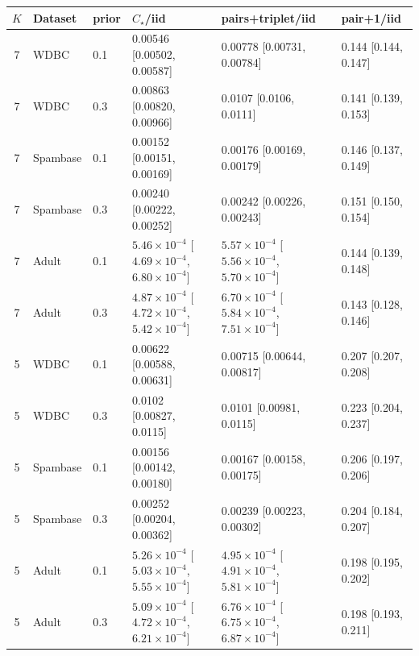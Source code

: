 \begin{tabular}{clllll}
\toprule
$K$ & Dataset & prior & $C_\star$/iid & pairs+triplet/iid & pair+1/iid \\
\midrule
7 & WDBC & 0.1 & 0.00546 [0.00502, 0.00587] & 0.00778 [0.00731, 0.00784] & 0.144 [0.144, 0.147] \\
7 & WDBC & 0.3 & 0.00863 [0.00820, 0.00966] & 0.0107 [0.0106, 0.0111] & 0.141 [0.139, 0.153] \\
7 & Spambase & 0.1 & 0.00152 [0.00151, 0.00169] & 0.00176 [0.00169, 0.00179] & 0.146 [0.137, 0.149] \\
7 & Spambase & 0.3 & 0.00240 [0.00222, 0.00252] & 0.00242 [0.00226, 0.00243] & 0.151 [0.150, 0.154] \\
7 & Adult & 0.1 & $5.46\times 10^{-4}$ [$4.69\times 10^{-4}$, $6.80\times 10^{-4}$] & $5.57\times 10^{-4}$ [$5.56\times 10^{-4}$, $5.70\times 10^{-4}$] & 0.144 [0.139, 0.148] \\
7 & Adult & 0.3 & $4.87\times 10^{-4}$ [$4.72\times 10^{-4}$, $5.42\times 10^{-4}$] & $6.70\times 10^{-4}$ [$5.84\times 10^{-4}$, $7.51\times 10^{-4}$] & 0.143 [0.128, 0.146] \\
\midrule
5 & WDBC & 0.1 & 0.00622 [0.00588, 0.00631] & 0.00715 [0.00644, 0.00817] & 0.207 [0.207, 0.208] \\
5 & WDBC & 0.3 & 0.0102 [0.00827, 0.0115] & 0.0101 [0.00981, 0.0115] & 0.223 [0.204, 0.237] \\
5 & Spambase & 0.1 & 0.00156 [0.00142, 0.00180] & 0.00167 [0.00158, 0.00175] & 0.206 [0.197, 0.206] \\
5 & Spambase & 0.3 & 0.00252 [0.00204, 0.00362] & 0.00239 [0.00223, 0.00302] & 0.204 [0.184, 0.207] \\
5 & Adult & 0.1 & $5.26\times 10^{-4}$ [$5.03\times 10^{-4}$, $5.55\times 10^{-4}$] & $4.95\times 10^{-4}$ [$4.91\times 10^{-4}$, $5.81\times 10^{-4}$] & 0.198 [0.195, 0.202] \\
5 & Adult & 0.3 & $5.09\times 10^{-4}$ [$4.72\times 10^{-4}$, $6.21\times 10^{-4}$] & $6.76\times 10^{-4}$ [$6.75\times 10^{-4}$, $6.87\times 10^{-4}$] & 0.198 [0.193, 0.211] \\
\bottomrule
\end{tabular}
